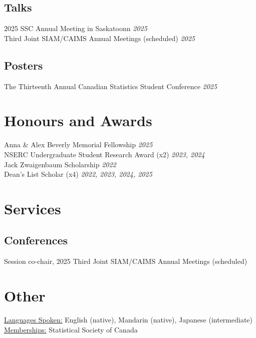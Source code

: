 \documentclass[11pt]{article}
\theoremstyle{definition}
\newcommand{\1}{\mathds 1}
\begin{document}
\subsection*{Talks}
2025 SSC Annual Meeting in Saskatoonn \hfill \textit{2025}\\
Third Joint SIAM/CAIMS Annual Meetings (scheduled) \hfill \textit{2025}

\subsection*{Posters}
The Thirteenth Annual Canadian Statistics Student Conference \hfill \textit{2025}

\section*{Honours and Awards}
Anna \& Alex Beverly Memorial Fellowship \hfill \textit{2025}\\
NSERC Undergraduate Student Research Award (x2) \hfill \textit{2023, 2024}\\
Jack Zwaigenbaum Scholarship \hfill \textit{2022}\\
Dean's List Scholar (x4) \hfill \textit{2022, 2023, 2024, 2025}

\section*{Services}
\subsection*{Conferences}
Session co-chair, 2025 Third Joint SIAM/CAIMS Annual Meetings (scheduled) 


\section*{Other}
\underline{Languages Spoken:} English (native), Mandarin (native), Japanese (intermediate)\\
\underline{Memberships:} Statistical Society of Canada
\end{document}

